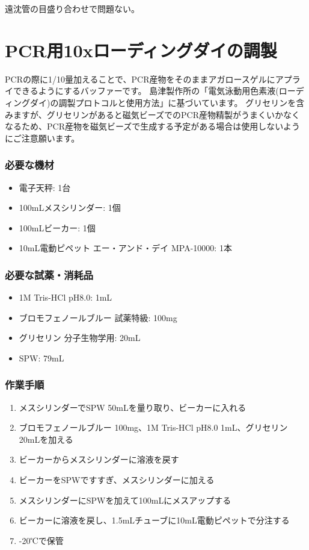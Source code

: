 \documentclass[titlepage,10pt,a4paper]{jsbook}
\begin{document}
遠沈管の目盛り合わせで問題ない。

\section{PCR用10xローディングダイの調製}\label{making10xloadingdye}

PCRの際に1/10量加えることで、PCR産物をそのままアガロースゲルにアプライできるようにするバッファーです。
島津製作所の「電気泳動用色素液(ローディングダイ)の調製プロトコルと使用方法」に基づいています。
グリセリンを含みますが、グリセリンがあると磁気ビーズでのPCR産物精製がうまくいかなくなるため、PCR産物を磁気ビーズで生成する予定がある場合は使用しないようにご注意願います。

\subsubsection{必要な機材}
\begin{itemize}
\item 電子天秤: 1台
\item 100mLメスシリンダー: 1個
\item 100mLビーカー: 1個
\item 10mL電動ピペット エー・アンド・デイ MPA-10000: 1本
\end{itemize}

\subsubsection{必要な試薬・消耗品}
\begin{itemize}
\item 1M Tris-HCl pH8.0: 1mL
\item ブロモフェノールブルー 試薬特級: 100mg
\item グリセリン 分子生物学用: 20mL
\item SPW: 79mL
\end{itemize}

\subsubsection{作業手順}
\begin{enumerate}
\item メスシリンダーでSPW 50mLを量り取り、ビーカーに入れる
\item ブロモフェノールブルー 100mg、1M Tris-HCl pH8.0 1mL、グリセリン20mLを加える
\item ビーカーからメスシリンダーに溶液を戻す
\item ビーカーをSPWですすぎ、メスシリンダーに加える
\item メスシリンダーにSPWを加えて100mLにメスアップする
\item ビーカーに溶液を戻し、1.5mLチューブに10mL電動ピペットで分注する
\item -20℃で保管
\end{enumerate}
\end{document}
